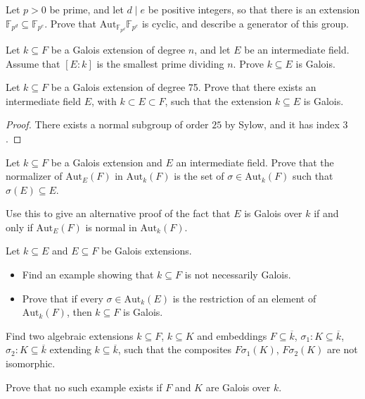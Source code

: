 \documentclass[openany]{book}
\begin{document}
\begin{prop}
Let $p > 0$ be prime, and let $d \mid e$ be positive integers, so that there is an extension $\mathbb{F}_{p^d} \subseteq \mathbb{F}_{p^e}$. Prove that $\text{Aut}_{\mathbb{F}_{p^d}} \mathbb{F}_{p^e}$ is cyclic, and describe a generator of this group.
\end{prop}

\begin{prop}
Let $k \subseteq F$ be a Galois extension of degree $n$, and let $E$ be an intermediate field. Assume that $[E : k]$ is the smallest prime dividing $n$. Prove $k \subseteq E$ is Galois.
\end{prop}

\begin{prob}
Let $k \subseteq F$ be a Galois extension of degree 75. Prove that there exists an intermediate field $E$, with $k \subset E \subset F$, such that the extension $k \subseteq E$ is Galois.
\end{prob}
\begin{proof}
    There exists a normal subgroup of order $25$ by Sylow, and it has index $3$.
\end{proof}

\begin{prob}
Let $k \subseteq F$ be a Galois extension and $E$ an intermediate field. Prove that the normalizer of $\text{Aut}_E(F)$ in $\text{Aut}_k(F)$ is the set of $\sigma \in \text{Aut}_k(F)$ such that $\sigma(E) \subseteq E$.

Use this to give an alternative proof of the fact that $E$ is Galois over $k$ if and only if $\text{Aut}_E(F)$ is normal in $\text{Aut}_k(F)$.
\end{prob}







\begin{prob}
Let $k \subseteq E$ and $E \subseteq F$ be Galois extensions.
\begin{itemize}
    \item Find an example showing that $k \subseteq F$ is not necessarily Galois.
    \item Prove that if every $\sigma \in \text{Aut}_k(E)$ is the restriction of an element of $\text{Aut}_k(F)$, then $k \subseteq F$ is Galois.
\end{itemize}
\end{prob}

\begin{prob}
Find two algebraic extensions $k \subseteq F$, $k \subseteq K$ and embeddings $F \subseteq \overline{k}$, $\sigma_1 : K \subseteq \overline{k}$, $\sigma_2 : K \subseteq \overline{k}$ extending $k \subseteq \overline{k}$, such that the composites $F\sigma_1(K)$, $F\sigma_2(K)$ are not isomorphic.

Prove that no such example exists if $F$ and $K$ are Galois over $k$.
\end{prob}
\end{document}
